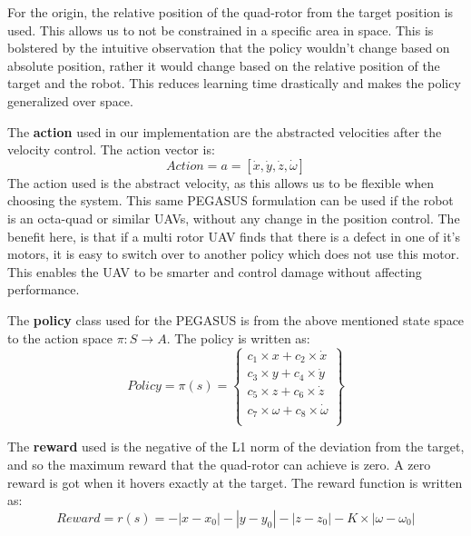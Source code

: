 \documentclass[hidelinks,BTech]{iitmdiss}
\begin{document}
For the origin, the relative position of the quad-rotor from the target position is used. This allows us to not be constrained in a specific area in space. This is bolstered by the intuitive observation that the policy wouldn't change based on absolute position, rather it would change based on the relative position of the target and the robot. This reduces learning time drastically and makes the policy generalized over space.

The {\bf action} used in our implementation are the abstracted velocities after the velocity control. The action vector is:
\begin{equation}
  Action = a = [\dot{x}, \dot{y}, \dot{z}, \dot{\omega}]
\end{equation}
The action used is the abstract velocity, as this allows us to be flexible when choosing the system. This same PEGASUS formulation can be used if the robot is an octa-quad or similar UAVs, without any change in the position control. The benefit here, is that if a multi rotor UAV finds that there is a defect in one of it's motors, it is easy to switch over to another policy which does not use this motor. This enables the UAV to be smarter and control damage without affecting performance.

The {\bf policy} class used for the PEGASUS is from the above mentioned state space to the action space $\pi: S \rightarrow A$. The policy is written as:
\begin{equation}
  Policy = \pi(s) = \left\{
    \begin{array}{c}
      c_1 \times x + c_2 \times \dot{x} \\
      c_3 \times y + c_4 \times \dot{y} \\
      c_5 \times z + c_6 \times \dot{z} \\
      c_7 \times \omega + c_8 \times \dot{\omega} \\
    \end{array}
  \right\}
\end{equation}


The {\bf reward} used is the negative of the L1 norm of the deviation from the target, and so the maximum reward that the quad-rotor can achieve is zero. A zero reward is got when it hovers exactly at the target. The reward function is written as:
\begin{equation}
  Reward = r(s) = - |x - x_0| - |y - y_0| - |z - z_0| - K \times |\omega - \omega_0|
\end{equation}
\end{document}
